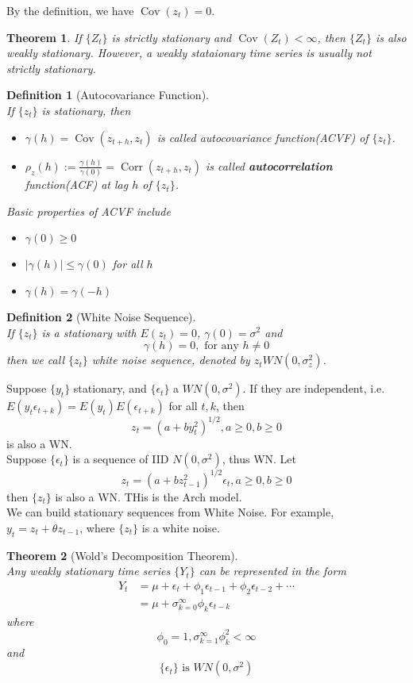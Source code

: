 \documentclass[12pt]{article}
\newtheorem{definition}{Definition}[section]
\newtheorem{theorem}{Theorem}[section]
\theoremstyle{definition}
\DeclareMathOperator{\cov}{Cov}
\DeclareMathOperator{\Corr}{Corr}
\begin{document}
By the definition, we have $\cov(z_t)=0$.
\begin{theorem}\normalfont If $\{Z_t\}$ is strictly stationary and $\cov(Z_t)<\infty$, then $\{Z_t\}$ is also weakly stationary. However, a weakly stataionary time series is usually not strictly stationary.
\end{theorem}
\begin{definition}[Autocovariance Function]
\hfill\\\normalfont If $\{z_t\}$ is stationary, then
\begin{itemize}
\item $\gamma(h)=\cov(z_{t+h}, z_t)$ is called autocovariance function(ACVF) of $\{z_t\}$.
\item $\rho_z(h):=\frac{\gamma(h)}{\gamma(0)}=\Corr(z_{t+h}, z_t)$ is called \textbf{autocorrelation} function(ACF) at lag $h$ of $\{z_t\}$.
\end{itemize}
Basic properties of ACVF include
\begin{itemize}
  \item $\gamma(0)\geq0$
  \item $|\gamma(h)|\leq \gamma(0)$ for all $h$
  \item $\gamma(h)=\gamma(-h)$
\end{itemize}
\end{definition}
\begin{definition}[White Noise Sequence]
\hfill\\\normalfont If $\{z_t\}$ is a stationary with $E(z_t)=0$, $\gamma(0)=\sigma^2$ and
\[
\gamma(h) = 0, \text{ for any }h\neq 0
\]
then we call $\{z_t\}$ white noise sequence, denoted by $z_t WN(0,\sigma_z^2)$.
\end{definition}
Suppose $\{y_t\}$ stationary, and $\{\epsilon_t\}$ a $WN(0, \sigma^2)$. If they are independent, i.e. $E(y_t\epsilon_{t+k})=E(y_t)E(\epsilon_{t+k})$ for all $t, k$, then
\[
z_t=(a+by_t^2)^{1/2}, a\geq 0, b\geq 0
\]
is also a WN.\\
Suppose $\{\epsilon_t\}$ is a sequence of IID $N(0,\sigma^2)$, thus WN. Let
\[
z_t=(a+bz_{t-1}^2)^{1/2}\epsilon_t, a\geq 0, b\geq 0
\]
then $\{z_t\}$ is also a WN. THis is the Arch model.\\
We can build stationary sequences from White Noise. For example, $y_t = z_t+\theta z_{t-1}$, where $\{z_t\}$ is a white noise.
\begin{theorem}[Wold's Decomposition Theorem]
\hfill\\\normalfont Any weakly stationary time series $\{Y_t\}$ can be represented in the form
\begin{align*}
Y_t &= \mu + \epsilon_t + \phi_1\epsilon_{t-1} + \phi_2\epsilon_{t-2} + \cdots\\
    &=\mu + \sigma_{k=0}^\infty \phi_k\epsilon_{t-k}
\end{align*}
where
\[
\phi_0 = 1, \sigma_{k=1}^\infty \phi_{k}^2 <\infty
\]
and
\[
\{\epsilon_t\}\text{ is }WN(0, \sigma^2)
\]
\end{theorem}
\end{document}
